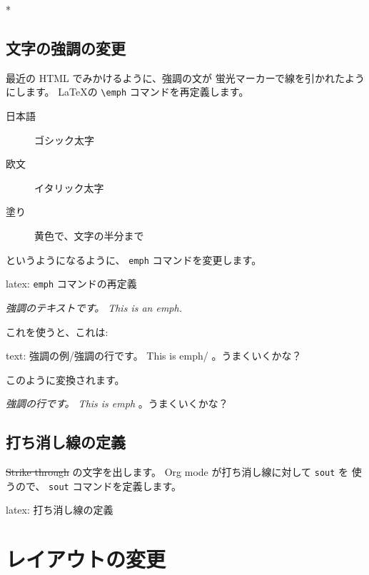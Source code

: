 \documentclass[dvipdfmx,a4j,14pt,uplatex,openany]{jsbook}
\begin{document}
*

\subsection{文字の強調の変更}
\label{sec:org38d91f5}
最近の HTML でみかけるように、強調の文が
蛍光マーカーで線を引かれたようにします。
\LaTeX の \texttt{\textbackslash{}emph} コマンドを再定義します。

\begin{description}
\item[{日本語}] ゴシック太字
\item[{欧文}] イタリック太字
\item[{塗り}] 黄色で、文字の半分まで
\end{description}

というようになるように、 \texttt{emph} コマンドを変更します。

\begin{programlist}[label={org8bbeb89}]{latex}{: \texttt{emph} コマンドの再定義}\usepackage[usetype1]{uline--}

\renewcommand{\emph}[1]{%
  {\sffamily\bfseries\itshape%
    \uline[
      background,
      color={[rgb]{1,1,0.0}},
      width=0.8em,position=1pt]{#1}}}
\end{programlist}

\emph{強調のテキストです。 This is an emph.}

これを使うと、これは:
\begin{programlist}[label={orga702aa1}]{text}{: 強調の例}/強調の行です。 This is emph/ 。うまくいくかな？
\end{programlist}

このように変換されます。

\emph{強調の行です。 This is emph} 。うまくいくかな？

\subsection{打ち消し線の定義}
\label{sec:org989fcc8}
\sout{\sout{Strike through}} の文字を出します。
Org mode が打ち消し線に対して \texttt{sout} を
使うので、 \texttt{sout} コマンドを定義します。

\begin{programlist}[label={orge17aae9}]{latex}{: 打ち消し線の定義}\newcommand{\sout}[1]{\mline{#1}}
\end{programlist}

\section{レイアウトの変更}
\label{sec:orgcd63d06}
\end{document}
